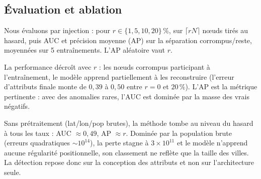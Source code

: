 \subsection{Évaluation et ablation}

Nous évaluons par injection : pour $r\in\{1,5,10,20\}\,\%$,
sur $\lceil rN\rceil$ nœuds tirés au hasard, puis AUC et
précision moyenne (AP) sur la séparation corrompus/reste, moyennées sur 5
entraînements. L'AP aléatoire vaut $r$.

\begin{table}[ht]
 \begin{center}
   \footnotesize
   \setlength{\tabcolsep}{3pt}
 \caption{Nœuds injectés : moyenne sur 5 entraînements, l'écart-type entre
parenthèses porte sur le dernier chiffre ($0{,}954(12)=0{,}954\pm0{,}012$).
Une AP aléatoire vaut $r$.} \label{tab:nodeauc}
 \end{center}
\end{table}

La performance décroît avec $r$ : les nœuds corrompus participant à
l'entraînement, le modèle apprend partiellement à les
reconstruire (l'erreur d'attributs finale monte de $0{,}39$ à $0{,}50$ entre $r=0$
et $20\,\%$). L'AP est la métrique pertinente : avec des anomalies rares, l'AUC est
dominée par la masse des vrais négatifs.

Sans prétraitement (lat/lon/pop brutes), la méthode tombe au niveau du hasard à tous
les taux : AUC $\approx0{,}49$, AP $\approx r$. Dominée par la population brute
(erreurs quadratiques $\sim10^{14}$), la perte stagne à $3\times10^{11}$ et le
modèle n'apprend aucune régularité positionnelle, son classement ne reflète que la
taille des villes. La détection repose donc sur la conception des attributs et non sur 
l'architecture seule.

